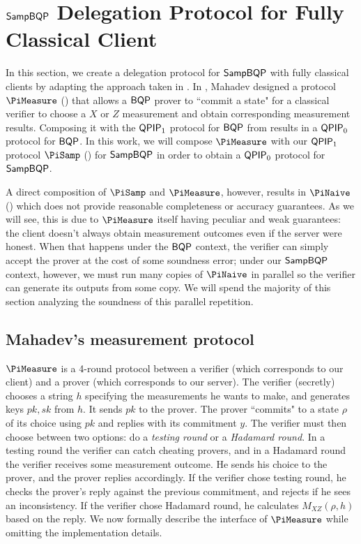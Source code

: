 \section{$\operatorname{\mathsf{SampBQP}}$ Delegation Protocol for Fully Classical Client}
\label{sec:qpip0_all}

In this section, we create a delegation protocol for $\operatorname{\mathsf{SampBQP}}$ with fully classical clients by adapting the approach taken in \cite{FOCS:Mahadev18a}. In \cite{FOCS:Mahadev18a}, 
Mahadev designed a protocol $\PiMeasure$ () that allows a $\operatorname{\mathsf{BQP}}$ prover to ``commit a state" for a classical verifier to choose a $X$ or $Z$ measurement and obtain corresponding measurement results.
Composing it with the $\operatorname{\mathsf{QPIP}}_1$ protocol for $\operatorname{\mathsf{BQP}}$ from \cite{mf16} results in a $\operatorname{\mathsf{QPIP}}_0$ protocol for $\operatorname{\mathsf{BQP}}$.
In this work, we will compose $\PiMeasure$ with our $\operatorname{\mathsf{QPIP}}_1$ protocol $\PiSamp$ () for $\operatorname{\mathsf{SampBQP}}$ in order to obtain a $\operatorname{\mathsf{QPIP}}_0$ protocol for $\operatorname{\mathsf{SampBQP}}$. 

A direct composition of $\PiSamp$ and $\PiMeasure$, however, results in $\PiNaive$ () which does not provide reasonable completeness or accuracy guarantees.
As we will see, this is due to $\PiMeasure$ itself having peculiar and weak guarantees:
the client doesn't always obtain measurement outcomes even if the server were honest.
When that happens under the $\operatorname{\mathsf{BQP}}$ context, the verifier can simply accept the prover at the cost of some soundness error;
under our $\operatorname{\mathsf{SampBQP}}$ context, however, we must run many copies of $\PiNaive$ in parallel so the verifier can generate its outputs from some copy.
We will spend the majority of this section analyzing the soundness of this parallel repetition.

\subsection{Mahadev's measurement protocol}\label{sec:urmila4}

$\PiMeasure$ is a 4-round protocol between a verifier (which corresponds to our client) and a prover (which corresponds to our server).
The verifier (secretly) chooses a string $h$ specifying the measurements he wants to make, and generates keys $pk, sk$ from $h$. It sends $pk$ to the prover. The prover ``commits" to a state $\rho$ of its choice using $pk$ and replies with its commitment $y$.
The verifier must then choose between two options: do a \emph{testing round} or a \emph{Hadamard round}.
In a testing round the verifier can catch cheating provers,
and in a Hadamard round the verifier receives some measurement outcome.
He sends his choice to the prover, and the prover replies accordingly. If the verifier chose testing round, he checks the prover's reply against the previous commitment, and rejects if he sees an inconsistency. If the verifier chose Hadamard round, he calculates $M_{XZ}(\rho, h)$ based on the reply.
We now formally describe the interface of $\PiMeasure$ while omitting the implementation details.

